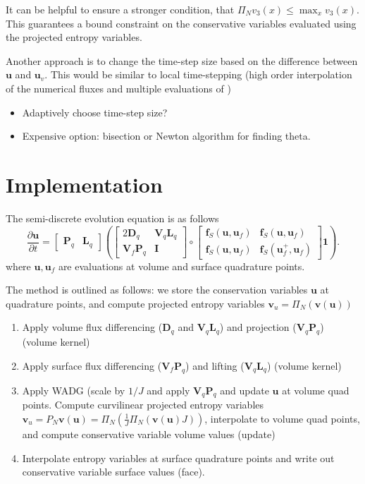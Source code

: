 \documentclass[preprint,10pt]{article}
\theoremstyle{definition}
\theoremstyle{lemma}
\theoremstyle{theorem}
\theoremstyle{assumption}
\newcommand{\pd}[2]{\frac{\partial#1}{\partial#2}}
\newcommand{\LRp}[1]{\left( #1 \right)}
\newcommand{\LRs}[1]{\left[ #1 \right]}
\begin{document}
It can be helpful to ensure a stronger condition, that $\Pi_N v_3(x) \leq \max_{x} v_3(x)$.  This guarantees a bound constraint on the conservative variables evaluated using the projected entropy variables.  

Another approach is to change the time-step size based on the difference between $\bm{u}$ and $\bm{u}_v$.  This would be similar to local time-stepping (high order interpolation of the numerical fluxes and multiple evaluations of )

\begin{itemize}
\item Adaptively choose time-step size?
\item Expensive option: bisection or Newton algorithm for finding theta.  
\end{itemize}

\section{Implementation}

The semi-discrete evolution equation is as follows
\[
\pd{\bm{u}}{t} = \LRs{\begin{array}{cc}
\bm{P}_q & \bm{L}_q
\end{array}}
\LRp{
\LRs{
\begin{array}{cc}
2\bm{D}_q & \bm{V}_q\bm{L}_q\\
\bm{V}_f\bm{P}_q & \bm{I}
\end{array} 
}\circ 
\LRs{
\begin{array}{cc}
\bm{f}_{S}(\bm{u},\bm{u}_f) & \bm{f}_{S}(\bm{u},\bm{u}_f)\\
 \bm{f}_{S}(\bm{u},\bm{u}_f) &  \bm{f}_S(\bm{u}_f^+,\bm{u}_f)
\end{array} 
}\bm{1}}.
\]
where $\bm{u}, \bm{u}_f$ are evaluations at volume and surface quadrature points.  

The method is outlined as follows: we store the conservation variables $\bm{u}$ at quadrature points, and compute projected entropy variables $\bm{v}_u = \Pi_N\LRp{\bm{v}(\bm{u})}$ 
\begin{enumerate}
\item Apply volume flux differencing ($\bm{D}_q$ and $\bm{V}_q\bm{L}_q$) and projection ($\bm{V}_q\bm{P}_q$) (volume kernel)
\item Apply surface flux differencing ($\bm{V}_f\bm{P}_q$) and lifting ($\bm{V}_q\bm{L}_q$) (volume kernel)
\item Apply WADG (scale by $1/J$ and apply $\bm{V}_q\bm{P}_q$ and update $\bm{u}$ at volume quad points.  Compute curvilinear projected entropy variables $\bm{v}_u = P_N\bm{v}(\bm{u}) =  \Pi_N\LRp{\frac{1}{J}\Pi_N\LRp{\bm{v}(\bm{u})J}}$, interpolate to volume quad points, and compute conservative variable volume values (update)
\item Interpolate entropy variables at surface quadrature points and write out conservative variable surface values (face).  
\end{enumerate}



\end{document}

